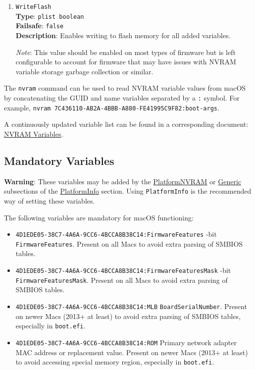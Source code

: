 \documentclass[]{article}
\providecommand{\tightlist}{%
  \setlength{\itemsep}{0pt}\setlength{\parskip}{0pt}}
\begin{document}
\begin{enumerate}
\item
  \texttt{WriteFlash}\\
  \textbf{Type}: \texttt{plist\ boolean}\\
  \textbf{Failsafe}: \texttt{false}\\
  \textbf{Description}: Enables writing to flash memory for all added variables.

  \emph{Note}: This value should be enabled on most types of firmware but is
  left configurable to account for firmware that may have issues with NVRAM
  variable storage garbage collection or similar.

\end{enumerate}

The \texttt{nvram} command can be used to read NVRAM variable values from macOS
by concatenating the GUID and name variables separated by a \texttt{:} symbol.
For example, \texttt{nvram 7C436110-AB2A-4BBB-A880-FE41995C9F82:boot-args}.

A continuously updated variable list can be found in a corresponding document:
\href{https://docs.google.com/spreadsheets/d/1HTCBwfOBkXsHiK7os3b2CUc6k68axdJYdGl-TyXqLu0}{NVRAM Variables}.

\subsection{Mandatory Variables}\label{nvramvars}

\textbf{Warning}: These variables may be added by the
\hyperref[platforminfonvram]{PlatformNVRAM} or
\hyperref[platforminfogeneric]{Generic} subsections of the
\hyperref[platforminfo]{PlatformInfo} section.
Using \texttt{PlatformInfo} is the recommended way of setting these variables.

The following variables are mandatory for macOS functioning:

\begin{itemize}
\tightlist
\item
  \texttt{4D1EDE05-38C7-4A6A-9CC6-4BCCA8B38C14:FirmwareFeatures}
  -bit \texttt{FirmwareFeatures}. Present on all Macs to avoid extra parsing of SMBIOS tables.
\item
  \texttt{4D1EDE05-38C7-4A6A-9CC6-4BCCA8B38C14:FirmwareFeaturesMask}
  -bit \texttt{FirmwareFeaturesMask}. Present on all Macs to avoid extra parsing
  of SMBIOS tables.
\item
  \texttt{4D1EDE05-38C7-4A6A-9CC6-4BCCA8B38C14:MLB}
  \break
  \texttt{BoardSerialNumber}. Present on newer Macs (2013+ at least) to avoid extra parsing
  of SMBIOS tables, especially in \texttt{boot.efi}.
\item
  \texttt{4D1EDE05-38C7-4A6A-9CC6-4BCCA8B38C14:ROM}
  \break
  Primary network adapter MAC address or replacement value. Present on newer Macs
  (2013+ at least) to avoid accessing special memory region, especially in \texttt{boot.efi}.
\end{itemize}
\end{document}
